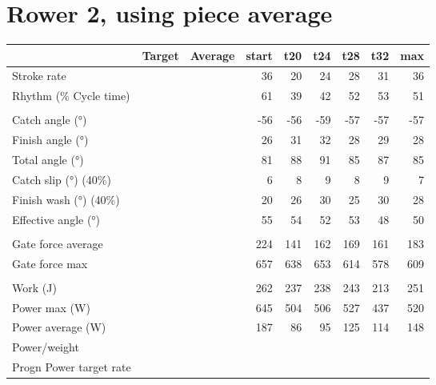 \documentclass[12pt]{article}%
\begin{document}
\section*{Rower 2, using piece average}%
\label{sec:Rower2,usingpieceaverage}%
\begin{tabular}{l|rrrrrrrr|}%
\hline%
&Target&Average&start&t20&t24&t28&t32&max\\%
\hline%
Stroke rate&&&36&20&24&28&31&36\\%
Rhythm (\% Cycle time)&&&61&39&42&52&53&51\\%
&&&&&&&&\\%
Catch angle (°)&&&{-}56&{-}56&{-}59&{-}57&{-}57&{-}57\\%
Finish angle (°)&&&26&31&32&28&29&28\\%
Total angle (°)&&&81&88&91&85&87&85\\%
Catch slip (°)  (40\%)&&&6&8&9&8&9&7\\%
Finish wash (°)  (40\%)&&&20&26&30&25&30&28\\%
Effective angle (°)&&&55&54&52&53&48&50\\%
&&&&&&&&\\%
Gate force average&&&224&141&162&169&161&183\\%
Gate force max&&&657&638&653&614&578&609\\%
&&&&&&&&\\%
Work (J)&&&262&237&238&243&213&251\\%
Power max (W)&&&645&504&506&527&437&520\\%
Power average (W)&&&187&86&95&125&114&148\\%
Power/weight&&&&&&&&\\%
Progn Power target rate&&&&&&&&\\%
\hline%
\end{tabular}%
\newline%
%

%
\end{document}
